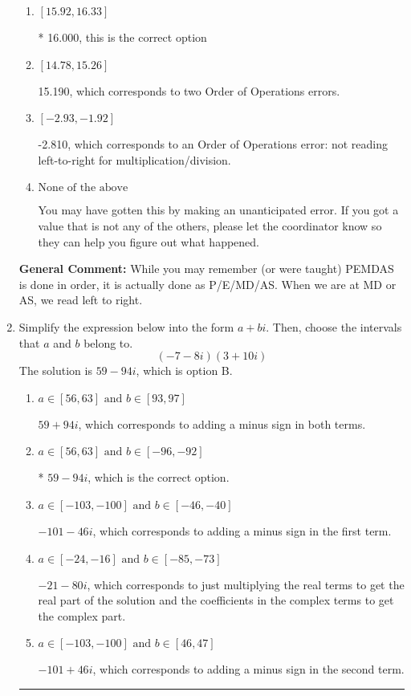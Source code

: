 \documentclass{extbook}[14pt]
\newcommand{\litem}[1]{\item #1

\rule{\textwidth}{0.4pt}}
\begin{document}
\begin{enumerate}
{\begin{enumerate}[label=\Alph*.]
 34.000, which corresponds to an Order of Operations error: multiplying by negative before squaring. For example: $(-3)^2 \neq -3^2$
\item \( [15.92, 16.33] \)

* 16.000, this is the correct option
\item \( [14.78, 15.26] \)

 15.190, which corresponds to two Order of Operations errors.
\item \( [-2.93, -1.92] \)

 -2.810, which corresponds to an Order of Operations error: not reading left-to-right for multiplication/division.
\item \( \text{None of the above} \)

 You may have gotten this by making an unanticipated error. If you got a value that is not any of the others, please let the coordinator know so they can help you figure out what happened.
\end{enumerate}

\textbf{General Comment:} While you may remember (or were taught) PEMDAS is done in order, it is actually done as P/E/MD/AS. When we are at MD or AS, we read left to right.
}
\litem{
Simplify the expression below into the form $a+bi$. Then, choose the intervals that $a$ and $b$ belong to.
\[ (-7 - 8 i)(3 + 10 i) \]The solution is \( 59 - 94 i \), which is option B.\begin{enumerate}[label=\Alph*.]
\item \( a \in [56, 63] \text{ and } b \in [93, 97] \)

 $59 + 94 i$, which corresponds to adding a minus sign in both terms.
\item \( a \in [56, 63] \text{ and } b \in [-96, -92] \)

* $59 - 94 i$, which is the correct option.
\item \( a \in [-103, -100] \text{ and } b \in [-46, -40] \)

 $-101 - 46 i$, which corresponds to adding a minus sign in the first term.
\item \( a \in [-24, -16] \text{ and } b \in [-85, -73] \)

 $-21 - 80 i$, which corresponds to just multiplying the real terms to get the real part of the solution and the coefficients in the complex terms to get the complex part.
\item \( a \in [-103, -100] \text{ and } b \in [46, 47] \)

 $-101 + 46 i$, which corresponds to adding a minus sign in the second term.
\end{enumerate}

}
\end{enumerate}
\end{document}
